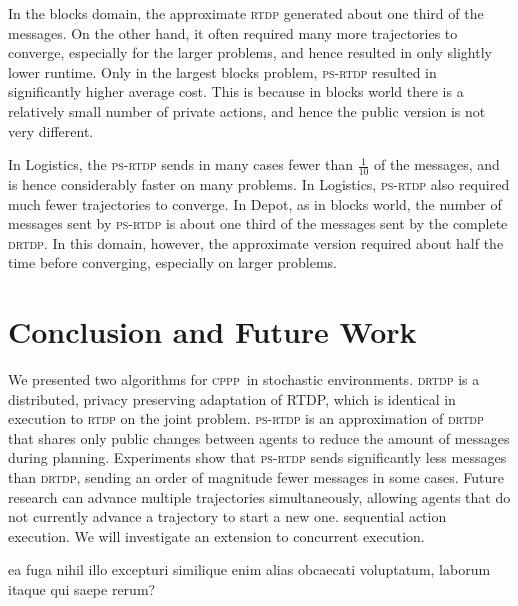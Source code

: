 \documentclass[letterpaper]{article} %
\newcommand{\mafs}{\textsc {mafs}\xspace}
\newcommand{\cppp}{\textsc {cppp}\xspace}
\newcommand{\rtdp}{\textsc {rtdp}\xspace}
\newcommand{\drtdp}{\textsc {drtdp}\xspace}
\newcommand{\psrtdp}{\textsc{ps}-\textsc{rtdp}\xspace}
\theoremstyle{remark}
\begin{document}
In the blocks domain, the approximate \rtdp generated about one third of the messages. On the other hand, it often required many more trajectories to converge, especially for the larger problems, and hence resulted in only slightly lower runtime. Only in the largest blocks problem, \psrtdp resulted in significantly higher average cost. This is because in blocks world there is a relatively small number of private actions, and hence the public version is not very different.

In Logistics, the \psrtdp sends in many cases fewer than $\frac{1}{10}$ of the messages, and is hence considerably faster on many problems. In Logistics, \psrtdp also required much fewer trajectories to converge.
In Depot, as in blocks world, the number of messages sent by \psrtdp is about one third of the messages sent by the complete \drtdp. In this domain, however, the approximate version required about half the time before converging, especially on larger problems.


\vspace{-3.57mm}
\section{Conclusion and Future Work}
We presented two algorithms for \cppp\ in stochastic environments. \drtdp is a distributed, privacy preserving adaptation of RTDP, which is identical in execution to \rtdp on the joint problem. %
\psrtdp is an approximation of \drtdp that shares only public changes between agents to reduce the amount of messages during planning. Experiments show that \psrtdp sends significantly less messages than \drtdp,
sending an order of magnitude fewer messages in some cases. %
Future research can advance multiple trajectories simultaneously, allowing agents that do not currently advance a trajectory to start a new one. %
sequential action execution. We will investigate an extension to concurrent execution.



ea fuga nihil illo excepturi similique enim alias obcaecati voluptatum, laborum itaque qui saepe rerum?\clearpage

\end{document}
